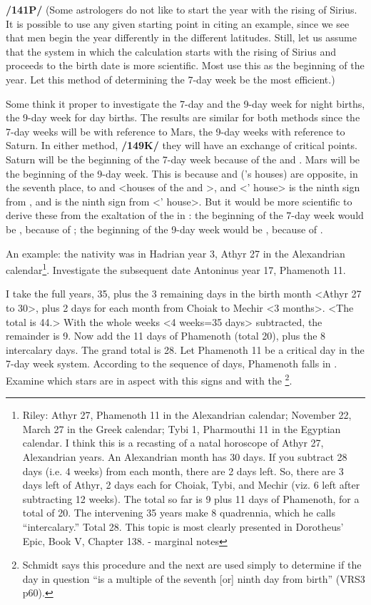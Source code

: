 \textbf{/141P/} (Some astrologers do not like to start the year with the rising of Sirius. It is possible to use any given starting point in citing an example, since we see that men begin the year differently in the different latitudes. Still, let us assume that the system in which the calculation starts with the rising of Sirius and proceeds to the birth date is more scientific. Most use this as the beginning of the year. Let this method of determining the 7-day week be the most efficient.)

Some think it proper to investigate the 7-day and the 9-day week for night births, the 9-day week for day births. The results are similar for both methods since the 7-day weeks will be with reference to Mars, the 9-day weeks with reference to Saturn. In either method, \textbf{/149K/} they will have an exchange of critical points. Saturn will be the beginning of the 7-day week because of the \Sun\xspace and \Moon. Mars will be the beginning of the 9-day week. This is because \Capricorn\xspace and \Aquarius\xspace (\Saturn’s houses) are opposite, in the seventh place, to \Cancer\xspace and \Leo\xspace <houses of the \Sun\xspace and \Moon>, and \Aries\xspace <\Mars’ house> is the ninth
sign from \Leo, and \Cancer\xspace is the ninth sign from \Scorpio\xspace <\Mars’ house>. But it would be more scientific to derive these from the exaltation of the \Moon\xspace in \Taurus: the beginning of the 7-day week would be \Mars, because of \Scorpio; the beginning of the 9-day week would be \Saturn, because of \Capricorn.

An example: the nativity was in Hadrian year 3, Athyr 27 in the Alexandrian calendar\footnote{Riley: Athyr 27, Phamenoth 11 in the Alexandrian calendar; November 22, March 27 in the Greek calendar; Tybi 1, Pharmouthi 11 in the Egyptian calendar.
I think this is a recasting of a natal horoscope of Athyr 27, Alexandrian years. An Alexandrian month has 30 days. If you subtract 28 days (i.e. 4 weeks) from each month, there are 2
days left. So, there are 3 days left of Athyr, 2 days each for Choiak, Tybi, and Mechir (viz. 6 left after subtracting 12 weeks). The total so far is 9 plus 11 days of Phamenoth, for a total of 20. The intervening 35 years make 8 quadrennia, which he calls “intercalary.” Total 28. This topic is most clearly presented in Dorotheus’ Epic, Book V, Chapter 138. - marginal notes}. Investigate the subsequent date Antoninus year 17, Phamenoth 11. 

I take the full years, 35, plus the 3 remaining days in the birth month <Athyr 27 to 30>, plus 2 days for each month from Choiak to Mechir <3 months>. <The total is 44.> With the whole weeks <4 weeks=35 days> subtracted, the remainder is 9. Now add the 11 days of Phamenoth (total 20), plus the 8 intercalary days. The grand total is 28. Let Phamenoth 11 be a critical day in the 7-day week system. According to the sequence of days, Phamenoth falls in \Scorpio.
Examine which stars are in aspect with this signs and with the \Moon\footnote{Schmidt says this procedure and the next are used simply to determine if the day in question ``is a multiple of the seventh [or] ninth day from birth'' (VRS3 p60).}.

